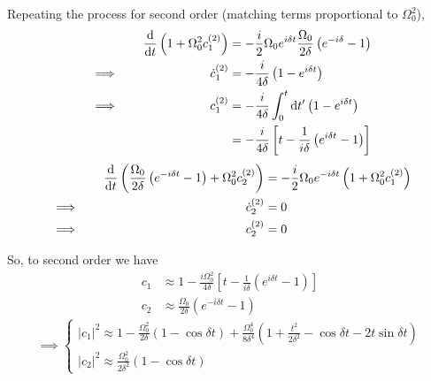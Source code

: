 \documentclass[12pt]{article}
\newcommand{\magsq}[1]{\big|#1\big|^2}
\begin{document}
Repeating the process for second order (matching terms proportional to $\Omega_0^2$),
\begin{alignat*}{3}
    &\quad & \dv{t}\left(1 + \Omega_0^2 c_1^{(2)}\right) &= -\frac{i}{2}\Omega_0e^{i\delta t}\frac{\Omega_0}{2\delta}\left(e^{-i\delta}-1\right) \\
    &\implies\quad & \dot{c}_1^{(2)} &= -\frac{i}{4\delta}\left(1 - e^{i\delta t}\right) \\
    &\implies\quad & c_1^{(2)} &= -\frac{i}{4\delta}\int_0^t \dd t'\left(1 - e^{i\delta t}\right) \\
    & & &= -\frac{i}{4\delta}\left[t - \frac{1}{i\delta}\left(e^{i\delta t} - 1\right)\right]
\end{alignat*}
\begin{alignat*}{3}
    &\quad & \dv{t}\left(\frac{\Omega_0}{2\delta}\left(e^{-i\delta t} - 1\right) + \Omega_0^2c_2^{(2)}\right) &= -\frac{i}{2}\Omega_0e^{-i\delta t}\left(1 + \Omega_0^2 c_1^{(2)}\right) \\
    &\implies\quad & \dot{c}_2^{(2)} &= 0 \\
    &\implies\quad & c_2^{(2)} &= 0
\end{alignat*}

So, to second order we have
\begin{equation*}
    \begin{aligned}
        c_1 &\approx 1 - \frac{i\Omega_0^2}{4\delta}\left[t - \frac{1}{i\delta}\left(e^{i\delta t} - 1\right)\right] \\
        c_2 &\approx \frac{\Omega_0}{2\delta}\left(e^{-i\delta t} - 1\right)
    \end{aligned}
\end{equation*}
\begin{equation*}
    \implies
    \begin{cases*}
        \magsq{c_1} \approx 1 - \frac{\Omega_0^2}{2\delta}\left(1 - \cos\delta t\right) + \frac{\Omega_0^4}{8\delta^4}\left(1 + \frac{t^2}{2\delta^2} - \cos\delta t - 2t\sin\delta t\right)  \\
        \magsq{c_2} \approx \frac{\Omega_0^2}{2\delta^2}\left(1 - \cos\delta t\right)
    \end{cases*}
\end{equation*}
\end{document}
